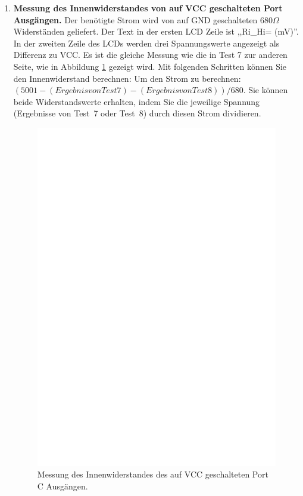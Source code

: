 \begin{enumerate}
\item {\bf Messung des Innenwiderstandes von auf VCC geschalteten Port Ausg\"angen.}
Der ben\"otigte Strom wird von auf GND geschalteten \(680\Omega\) Widerst\"anden geliefert.
Der Text in der ersten LCD Zeile ist ,,Ri\_Hi= (mV)''.
In der zweiten Zeile des LCDs werden drei Spannungswerte angezeigt als Differenz zu VCC.
Es ist die gleiche Messung wie die in Test 7 zur anderen Seite, wie in Abbildung \ref{fig:test8} gezeigt wird.
Mit folgenden Schritten k\"onnen Sie den Innenwiderstand berechnen:
Um den Strom zu berechnen: \((5001 - (Ergebnis von Test 7) - (Ergebnis von Test 8)) / 680\).
Sie k\"onnen beide Widerstandswerte erhalten, indem Sie die jeweilige Spannung
(Ergebnisse von Test~7 oder Test~8) durch diesen Strom dividieren.
\begin{figure}[H]
\centering
\includegraphics[]{../FIG/Test8.eps}
\caption{Messung des Innenwiderstandes des auf VCC geschalteten Port C Ausg\"angen.}
\label{fig:test8}
\end{figure}


\end{enumerate}
